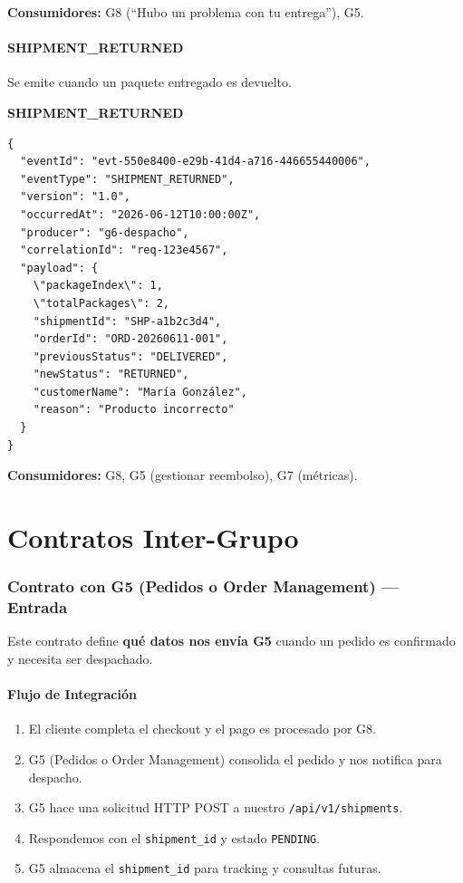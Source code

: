 \documentclass[11pt, a4paper]{article}
\newcommand{\contractheader}[1]{%
  \noindent\colorbox{primary!10}{%
    \parbox{\dimexpr\textwidth-2\fboxsep}{%
      \textbf{\faFileCode\quad #1}%
    }%
  }
  \vspace{0.3cm}
}
\begin{document}
\textbf{Consumidores:} G8 (``Hubo un problema con tu entrega''), G5.

\vspace{0.4cm}

\subsection{SHIPMENT\_RETURNED}

Se emite cuando un paquete entregado es devuelto.

\contractheader{SHIPMENT\_RETURNED}

\begin{lstlisting}
{
  "eventId": "evt-550e8400-e29b-41d4-a716-446655440006",
  "eventType": "SHIPMENT_RETURNED",
  "version": "1.0",
  "occurredAt": "2026-06-12T10:00:00Z",
  "producer": "g6-despacho",
  "correlationId": "req-123e4567",
  "payload": {
    \"packageIndex\": 1,
    \"totalPackages\": 2,
    "shipmentId": "SHP-a1b2c3d4",
    "orderId": "ORD-20260611-001",
    "previousStatus": "DELIVERED",
    "newStatus": "RETURNED",
    "customerName": "María González",
    "reason": "Producto incorrecto"
  }
}
\end{lstlisting}

\textbf{Consumidores:} G8, G5 (gestionar reembolso), G7 (métricas).


\newpage
\part{Contratos Inter-Grupo}

\section{Contrato con G5 (Pedidos o Order Management) --- Entrada}
\label{sec:contrato-g5}

Este contrato define \textbf{qué datos nos envía G5} cuando un pedido es
confirmado y necesita ser despachado.

\subsection{Flujo de Integración}

\begin{enumerate}[noitemsep]
  \item El cliente completa el checkout y el pago es procesado por G8.
  \item G5 (Pedidos o Order Management) consolida el pedido y nos notifica para despacho.
  \item G5 hace una solicitud HTTP POST a nuestro \texttt{/api/v1/shipments}.
  \item Respondemos con el \texttt{shipment\_id} y estado \texttt{PENDING}.
  \item G5 almacena el \texttt{shipment\_id} para tracking y consultas futuras.
\end{enumerate}
\end{document}
